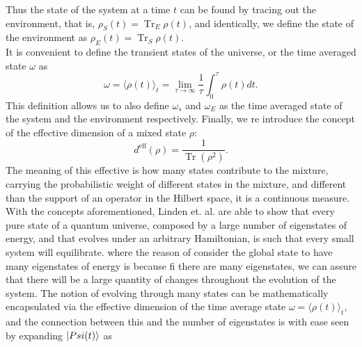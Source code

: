 Thus the state of the system at a time $t$ can be found by tracing out the environment, that is, $\rho_S(t)=\operatorname{Tr}_E \rho(t)$, and identically, we define the state of the environment as $\rho_E(t)=\operatorname{Tr}_S \rho(t)$.\\
\indent It is convenient to define the transient states of the universe, or the time averaged state $\omega$ as
\begin{equation}
\omega=\langle\rho(t)\rangle_{t}=\lim _{\tau \rightarrow \infty} \frac{1}{\tau} \int_{0}^{\tau} \rho(t) d t.
\label{CH1:average_time_state}
\end{equation}
This definition allows us to also define $\omega_s$ and $\omega_E$ as the time averaged state of the system and the environment respectively. Finally, we re introduce the concept of the effective dimension of a mixed state $\rho$:
\begin{equation}
d^{\mathrm{eff}}(\rho)=\frac{1}{\operatorname{Tr}\left(\rho^{2}\right)}.
\label{CH1:Effective_dimension}
\end{equation}
The meaning of this effective is how many states contribute to the mixture, carrying the probabilistic weight of different states in the mixture, and different than the support of an operator in the Hilbert space, it is a continuous measure.\\
\indent With the concepts aforementioned, Linden et. al.  \cite{linden_quantum_2009} are able to show that every pure state of a quantum universe, composed by a large number of eigenstates of energy, and that evolves under an arbitrary Hamiltonian, is such that every small system will equilibrate. where the reason of consider the global state to have many eigenstates of energy is because fi there are many eigenstates, we can assure that there will be a large quantity of changes throughout the evolution of the system. The notion of evolving through many states can be mathematically encapsulated via the effective dimension of the time average state $\omega=\langle\rho(t)\rangle_{t}$, and the connection between this and the number of eigenstates is with ease seen by expanding $\mathinner{|{Psi(t)}\rangle}$ as

